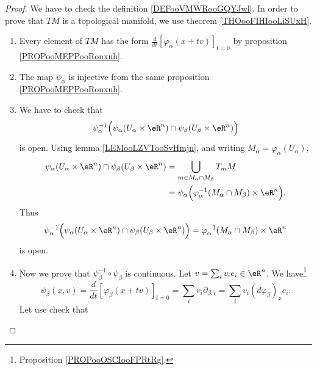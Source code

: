 \begin{proof}
	We have to check the definition \ref{DEFooVMWRooGQYJwl}. In order to prove that \( TM\) is a topological manifold, we use theorem \ref{THOooFIHIooLiSUxH}.
	\begin{enumerate}
		\item
		      Every element of \( TM\) has the form \( \frac{d}{dt} \left[ \varphi_{\alpha}(x+tv)  \right]_{t=0}\) by proposition \ref{PROPooMEPPooRonxuh}.
		\item
		      The map \( \psi_{\alpha}\) is injective from the same proposition \ref{PROPooMEPPooRonxuh}.
		\item
		      We have to check that
		      \begin{equation}
			      \psi_{\alpha}^{-1}\Big( \psi_{\alpha}(U_{\alpha}\times \eR^n)\cap\psi_{\beta}(U_{\beta}\times \eR^n) \Big)
		      \end{equation}
		      is open. Using lemma \ref{LEMooLZVTooSvHmjn}, and writing \( M_{\alpha}=\varphi_{\alpha}(U_{\alpha})\),
		      \begin{subequations}
			      \begin{align}
				      \psi_{\alpha}(U_{\alpha}\times \eR^n)\cap\psi_{\beta}(U_{\beta}\times \eR^n) & =\bigcup_{m\in M_{\alpha}\cap M_{\beta}}T_mM                                           \\
				                                                                                   & =\psi_{\alpha}\Big( \varphi_{\alpha}^{-1}(M_{\alpha}\cap M_{\beta})\times \eR^n \Big).
			      \end{align}
		      \end{subequations}
		      Thus
		      \begin{equation}
			      \psi_{\alpha}^{-1}\Big( \psi_{\alpha}(U_{\alpha}\times \eR^n)\cap\psi_{\beta}(U_{\beta}\times \eR^n) \Big)=
			      \varphi_{\alpha}^{-1}(M_{\alpha}\cap M_{\beta})\times \eR^n
		      \end{equation}
		      is open.
		\item
		      Now we prove that \( \psi_{\beta}^{-1}\circ\psi_{\beta}\) is continuous. Let \( v=\sum_iv_ie_i\in \eR^n\). We have\footnote{Proposition \ref{PROPooOSCIooFPRtRg}.}
		      \begin{equation}
			      \psi_{\beta}(x,v)=\frac{d}{dt} \left[ \varphi_{\beta}(x+tv)  \right]_{t=0}=\sum_iv_i\partial_{\beta,i}=\sum_iv_i(d\varphi_{\beta})_xe_i.
		      \end{equation}
		      Let use check that
		      \begin{equation}

\end{equation}
\end{enumerate}
\end{proof}
